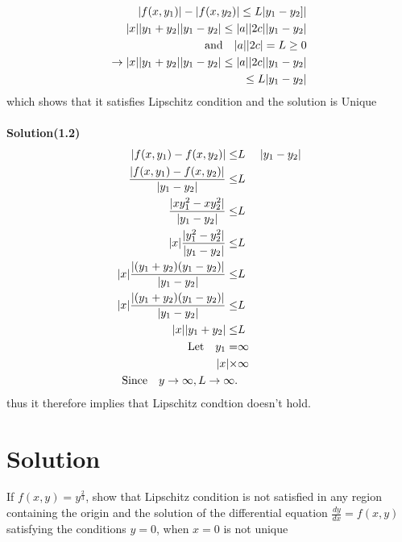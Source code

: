 \documentclass[a4paper, 12pt]{article}
\begin{document}
\begin{eqnarray}
\nonumber \arrowvert f(x,y_1) \arrowvert - \arrowvert f(x,y_2) \arrowvert \le L \arrowvert y_1 - y_2 ]\arrowvert \\
\nonumber \arrowvert x \arrowvert \arrowvert y_1 + y_2 \arrowvert \arrowvert y_1 - y_2 \arrowvert \le \arrowvert a \arrowvert \arrowvert 2c \arrowvert \arrowvert y_1 - y_2 \arrowvert \\
\nonumber \text{and}\quad \arrowvert a \arrowvert \arrowvert 2c \arrowvert = L \ge 0 \\
\nonumber \rightarrow \arrowvert x \arrowvert \arrowvert y_1 + y_2 \arrowvert \arrowvert y_1 - y_2 \arrowvert \le \arrowvert a \arrowvert \arrowvert 2c \arrowvert \arrowvert y_1 - y_2 \arrowvert\\
\nonumber \le L \arrowvert y_1 - y_2 \arrowvert
\end{eqnarray} which shows that it satisfies Lipschitz condition and the solution is Unique\\~\\
\textbf{Solution(1.2)} \begin{eqnarray}
\nonumber \arrowvert f(x,y_1) - f(x,y_2) \arrowvert \le & L & \arrowvert y_1 - y_2 \arrowvert \\
\nonumber \frac{\arrowvert f(x,y_1) - f(x,y_2)\arrowvert} {\arrowvert y_1 - y_2 \arrowvert} \le & L \\
\nonumber \frac{\arrowvert xy^2_1 - xy^2_2  \arrowvert} {\arrowvert y_1 - y_2 \arrowvert} \le & L \\
\nonumber \arrowvert x \arrowvert \frac{\arrowvert y^2_1 - y^2_2  \arrowvert} {\arrowvert y_1 - y_2 \arrowvert} \le & L\\
\nonumber \arrowvert x \arrowvert \frac{\arrowvert (y_1 +y_2) (y_1 - y_2)  \arrowvert} {\arrowvert y_1 - y_2 \arrowvert} \le & L\\
\nonumber \arrowvert x \arrowvert \frac{\arrowvert (y_1 +y_2) (y_1 - y_2)  \arrowvert} {\arrowvert y_1 - y_2 \arrowvert} \le & L\\
\nonumber \arrowvert x \arrowvert \arrowvert y_1 + y_2 \arrowvert \le & L\\
\nonumber \text{Let} \quad  y_1 = & \infty \\
\nonumber \arrowvert x \arrowvert \times & \infty\\
\nonumber \text{Since} \quad y \rightarrow \infty, L \rightarrow \infty.  
\end{eqnarray} thus it therefore implies that Lipschitz condtion doesn't hold. 
\section{Solution}
If $ f(x,y) = y ^\frac{2}{3} $, show that Lipschitz condition is not satisfied in any region containing the origin and the solution of the differential equation $ \frac{dy}{dx} = f(x,y) $ satisfying the conditions $y=0$, when $x=0$ is not unique
\end{document}
